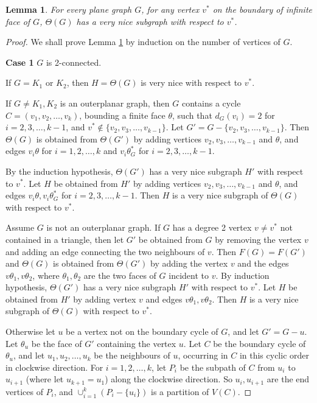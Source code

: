 \documentclass[11pt,a4paper]{article}
\newtheorem{lem}{Lemma}
\theoremstyle{definition}
\begin{document}
\begin{lem}
    \label{lem-verynice}
    For every  plane graph $G$, for any vertex $v^*$ on the boundary of infinite face of $G$, $\Theta(G)$ has a very nice subgraph with respect to $v^*$.
\end{lem}
\begin{proof}
   We shall prove Lemma \ref{lem-verynice} by induction on the number of vertices of $G$. 
   

   \medskip
   \noindent
   {\bf Case 1} $G$ is 2-connected.
   \medskip
   
   If $G=K_1$ or $K_2$, then $H=\Theta(G)$ is very nice with respect to $v^*$. 
   
   If $G \ne K_1, K_2$ is an outerplanar graph, then $G$ contains a cycle $C=(v_1,v_2,\ldots, v_k)$, bounding a finite face $\theta$,  such that $d_G(v_i)=2$ for $i=2,3,\ldots, k-1$, and $v^* \notin \{v_2, v_3, \ldots, v_{k-1}\}$. Let $G'=G-\{v_2, v_3, \ldots, v_{k-1}\}$. Then $\Theta(G)$ is obtained from $\Theta(G')$ by adding vertices $v_2,v_3, \ldots, v_{k-1}$ and $\theta$, and edges $v_i \theta$ for $i=1, 2, \ldots, k$ and $v_i \theta^*_G$ for $i=2,3,\ldots, k-1$. 
   
   By the induction hypothesis, $\Theta(G')$ has a very nice subgraph $H'$  with respect to $v^*$. Let $H$ be obtained from $H'$ by adding vertices $v_2,v_3, \ldots, v_{k-1}$ and $\theta$, and edges $v_i \theta, v_i \theta^*_G$   for $i=2,3,\ldots, k-1$.  Then $H$ is a very nice subgraph of $\Theta(G)$ with respect to $v^*$. 



   Assume $G$ is not an outerplanar graph. 
   If $G$ has a degree 2 vertex $v \ne v^*$ not contained in a triangle, then let $G'$ be obtained from $G$ by removing the vertex $v$ and adding an edge connecting the two neighbours of $v$. Then $F(G)=F(G')$ and $\Theta(G)$ is obtained from $\Theta(G') $ by adding the vertex $v$ and the edges $v \theta_1, v \theta_2$, where $\theta_1,\theta_2$ are the two faces of $G$ incident to $v$. By induction hypothesis, $\Theta(G')$ has a very nice subgraph $H'$ with respect to $v^*$. Let $H$ be obtained from $H'$ by adding vertex $v$ and edges $v \theta_1, v \theta_2$. Then $H$ is a very nice subgraph of $\Theta(G)$ with respect to $v^*$.
 
Otherwise let $u$ be a vertex not on the boundary cycle of $G$, and let $G'=G-u$. Let $\theta_u$ be the face of $G'$ containing the vertex $u$. 
Let $C$ be the boundary cycle of $\theta_u$, and let 
 $u_1,u_2,\ldots, u_k$ be the neighbours of $u$, occurring in $C$ in this cyclic order in clockwise direction.  For $i=1,2,\ldots, k$, let $P_i$ be the subpath of $C$ from $u_i$ to $u_{i+1}$ (where let $u_{k+1}=u_1$) along the clockwise direction. So $u_i,u_{i+1}$ are the end vertices of $P_i$, and $\cup_{i=1}^k(P_i-\{u_i\})$ is a partition of $V(C)$. 
    

\end{proof}
\end{document}
